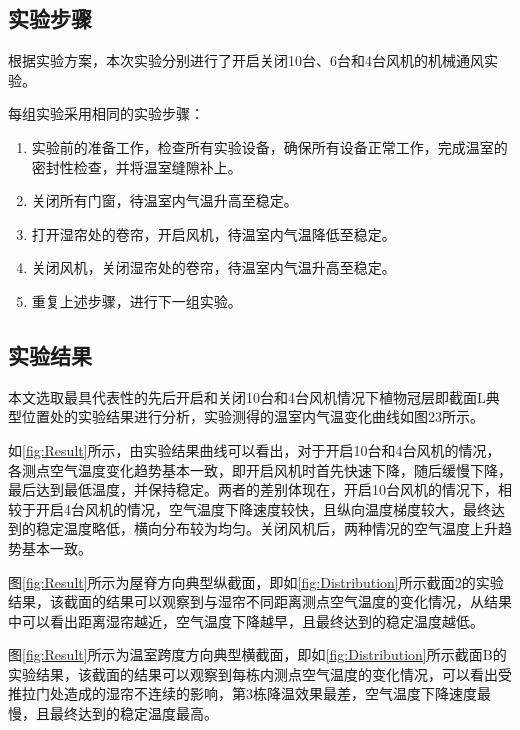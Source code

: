 	\subsection{实验步骤}
根据实验方案，本次实验分别进行了开启关闭10台、6台和4台风机的机械通风实验。
	
每组实验采用相同的实验步骤：
	\begin{enumerate}
		\item 实验前的准备工作，检查所有实验设备，确保所有设备正常工作，完成温室的密封性检查，并将温室缝隙补上。
		\item 关闭所有门窗，待温室内气温升高至稳定。
		\item 打开湿帘处的卷帘，开启风机，待温室内气温降低至稳定。
		\item 关闭风机，关闭湿帘处的卷帘，待温室内气温升高至稳定。
		\item 重复上述步骤，进行下一组实验。
	\end{enumerate}
	
	\subsection{实验结果}
	本文选取最具代表性的先后开启和关闭10台和4台风机情况下植物冠层即截面L典型位置处的实验结果进行分析，实验测得的温室内气温变化曲线如图23所示。
	\begin{figure}[!htbp]
		\centering
 	\end{figure}
	如\ref{fig:Result}所示，由实验结果曲线可以看出，对于开启10台和4台风机的情况，各测点空气温度变化趋势基本一致，即开启风机时首先快速下降，随后缓慢下降，最后达到最低温度，并保持稳定。两者的差别体现在，开启10台风机的情况下，相较于开启4台风机的情况，空气温度下降速度较快，且纵向温度梯度较大，最终达到的稳定温度略低，横向分布较为均匀。关闭风机后，两种情况的空气温度上升趋势基本一致。
	
图\ref{fig:Result}所示为屋脊方向典型纵截面，即如\ref{fig:Distribution}所示截面2的实验结果，该截面的结果可以观察到与湿帘不同距离测点空气温度的变化情况，从结果中可以看出距离湿帘越近，空气温度下降越早，且最终达到的稳定温度越低。

图\ref{fig:Result}所示为温室跨度方向典型横截面，即如\ref{fig:Distribution}所示截面B的实验结果，该截面的结果可以观察到每栋内测点空气温度的变化情况，可以看出受推拉门处造成的湿帘不连续的影响，第3栋降温效果最差，空气温度下降速度最慢，且最终达到的稳定温度最高。


